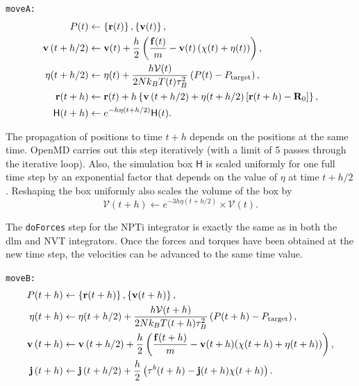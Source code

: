 \documentclass[]{book}
\begin{document}
{\tt moveA:}
\begin{align*}
P(t) &\leftarrow \left\{{\bf r}(t)\right\}, \left\{{\bf v}(t)\right\} ,\\
%
{\bf v}\left(t + h / 2\right)  &\leftarrow {\bf v}(t) 
	+ \frac{h}{2} \left( \frac{{\bf f}(t)}{m} - {\bf v}(t)
	\left(\chi(t) + \eta(t) \right) \right), \\
%
\eta(t + h / 2) &\leftarrow \eta(t) + \frac{h 
	\mathcal{V}(t)}{2 N k_B T(t) \tau_B^2} \left( P(t) 
	- P_{\mathrm{target}} \right), \\ 
%
{\bf r}(t + h) &\leftarrow {\bf r}(t) + h 
	\left\{ {\bf v}\left(t + h / 2 \right) 
	+ \eta(t + h / 2)\left[ {\bf r}(t + h) 
	- {\bf R}_0 \right] \right\} ,\\
%
\mathsf{H}(t + h) &\leftarrow e^{-h \eta(t + h / 2)} 
	\mathsf{H}(t).
\end{align*}

The propagation of positions to time $t + h$
depends on the positions at the same time.  {\sc OpenMD} carries out
this step iteratively (with a limit of 5 passes through the iterative
loop).  Also, the simulation box $\mathsf{H}$ is scaled uniformly for
one full time step by an exponential factor that depends on the value
of $\eta$ at time $t +
h / 2$.  Reshaping the box uniformly also scales the volume of
the box by
\begin{equation}
\mathcal{V}(t + h) \leftarrow e^{ - 3 h \eta(t + h /2)} \times
\mathcal{V}(t).
\end{equation}

The {\tt doForces} step for the NPTi integrator is exactly the same as
in both the {\sc dlm} and NVT integrators.  Once the forces and torques have
been obtained at the new time step, the velocities can be advanced to
the same time value.

{\tt moveB:}
\begin{align*}
P(t + h) &\leftarrow  \left\{{\bf r}(t + h)\right\},
	\left\{{\bf v}(t + h)\right\}, \\
%
\eta(t + h) &\leftarrow \eta(t + h / 2) +
	\frac{h \mathcal{V}(t + h)}{2 N k_B T(t + h) 
	\tau_B^2} \left( P(t + h) - P_{\mathrm{target}} \right), \\ 
%
{\bf v}\left(t + h \right)  &\leftarrow {\bf v}\left(t 
	+ h / 2 \right) + \frac{h}{2} \left(
	\frac{{\bf f}(t + h)}{m} - {\bf v}(t + h)
	(\chi(t + h) + \eta(t + h)) \right) ,\\
%
{\bf j}\left(t + h \right)  &\leftarrow {\bf j}\left(t 
	+ h / 2 \right) + \frac{h}{2} \left( {\bf
	\tau}^b(t + h) - {\bf j}(t + h)
	\chi(t + h) \right) .
\end{align*}
\end{document}
